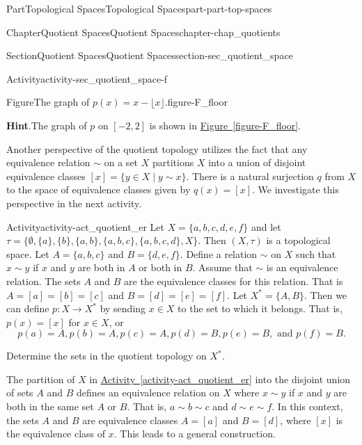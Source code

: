 \documentclass[oneside,10pt,]{book}
\newcommand{\blocktitlefont}{\relax}
\newcommand{\xreffont}{\relax}
\numberwithin{equation}{chapter}
\begin{document}
\begin{partptx}{Part}{Topological Spaces}{}{Topological Spaces}{}{}{part-part-top-spaces}
\begin{chapterptx}{Chapter}{Quotient Spaces}{}{Quotient Spaces}{}{}{chapter-chap_quotients}
\begin{sectionptx}{Section}{Quotient Spaces}{}{Quotient Spaces}{}{}{section-sec_quotient_space}
\begin{activity}{Activity}{}{activity-sec_quotient_space-f}
\begin{enumerate}[font=\bfseries,label=(\alph*),ref=\alph*]
\begin{figureptx}{Figure}{The graph of \(p(x) = x - \lfloor x\rfloor\).}{figure-F_floor}{}
\begin{image}{0.25}{0.5}{0.25}{}
\end{image}%
\tcblower
\end{figureptx}%
\par\smallskip%
\noindent\textbf{\blocktitlefont Hint}.\hypertarget{hint-sec_quotient_space-f-b-b}{}\quad{}The graph of \(p\) on \([-2,2]\) is shown in \hyperref[figure-F_floor]{Figure~{\xreffont\ref{figure-F_floor}}}.%
\end{enumerate}%
\end{activity}%
Another perspective of the quotient topology utilizes the fact that any equivalence relation \(\sim\) on a set \(X\) partitions \(X\) into a union of disjoint equivalence classes \([x] = \{y \in X \mid y \sim x\}\). There is a natural surjection \(q\) from \(X\) to the space of equivalence classes given by \(q(x) = [x]\). We investigate this perspective in the next activity.%
\begin{activity}{Activity}{}{activity-act_quotient_er}%
Let \(X = \{a,b,c,d,e,f\}\) and let \(\tau = \{\emptyset, \{a\}, \{b\}, \{a, b\}, \{a, b, c\}, \{a, b, c, d\}, X\}\). Then \((X, \tau)\) is a topological space. Let \(A = \{a, b, c\}\) and \(B = \{d,e,f\}\). Define a relation \(\sim\) on \(X\) such that \(x \sim y\) if \(x\) and \(y\) are both in \(A\) or both in \(B\). Assume that \(\sim\) is an equivalence relation. The sets \(A\) and \(B\) are the equivalence classes for this relation. That is \(A = [a] = [b] = [c]\) and \(B = [d] = [e] = [f]\). Let \(X^* = \{A,B\}\). Then we can define \(p : X \to X^*\) by sending \(x \in X\) to the set to which it belongs. That is, \(p(x) = [x]\) for \(x \in X\), or%
\begin{equation*}
p(a) = A, p(b) = A, p(c) = A, p(d) = B, p(e) = B, \text{ and }  p(f) = B\text{.}
\end{equation*}
%
\par
Determine the sets in the quotient topology on \(X^*\).%
\end{activity}%
The partition of \(X\) in \hyperref[activity-act_quotient_er]{Activity~{\xreffont\ref{activity-act_quotient_er}}} into the disjoint union of sets \(A\) and \(B\) defines an equivalence relation on \(X\) where \(x \sim y\) if \(x\) and \(y\) are both in the same set \(A\) or \(B\). That is, \(a \sim b \sim c\) and \(d \sim e \sim f\). In this context, the sets \(A\) and \(B\) are equivalence classes \textemdash{} \(A = [a]\) and \(B = [d]\), where \([x]\) is the equivalence class of \(x\). This leads to a general construction.%
\par

\end{sectionptx}
\end{chapterptx}
\end{partptx}
\end{document}
